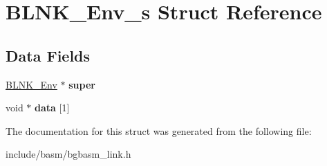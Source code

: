 \hypertarget{structBLNK__Env__s}{\section{B\-L\-N\-K\-\_\-\-Env\-\_\-s Struct Reference}
\label{structBLNK__Env__s}
}
\subsection*{Data Fields}
\begin{DoxyCompactItemize}
\item 
\hypertarget{structBLNK__Env__s_a91120b2e2f2e37fe5d0f9fdb33077e35}{\hyperlink{structBLNK__Env__s}{B\-L\-N\-K\-\_\-\-Env} $\ast$ {\bfseries super}}\label{structBLNK__Env__s_a91120b2e2f2e37fe5d0f9fdb33077e35}

\item 
\hypertarget{structBLNK__Env__s_a6127b8ae1941584a9f029d2d19f9a4d6}{void $\ast$ {\bfseries data} \mbox{[}1\mbox{]}}\label{structBLNK__Env__s_a6127b8ae1941584a9f029d2d19f9a4d6}

\end{DoxyCompactItemize}


The documentation for this struct was generated from the following file\-:\begin{DoxyCompactItemize}
\item 
include/basm/bgbasm\-\_\-link.\-h\end{DoxyCompactItemize}
